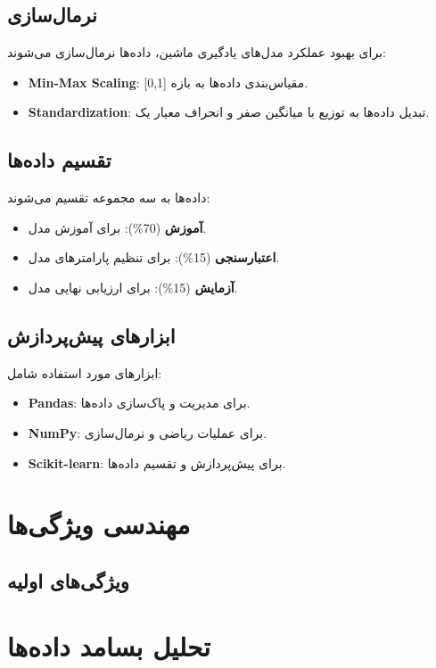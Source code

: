 \subsection{نرمال‌سازی}
برای بهبود عملکرد مدل‌های یادگیری ماشین، داده‌ها نرمال‌سازی می‌شوند:
\begin{itemize}
	\item \textbf{Min-Max Scaling}: مقیاس‌بندی داده‌ها به بازه [0,1].
	\item \textbf{Standardization}: تبدیل داده‌ها به توزیع با میانگین صفر و انحراف معیار یک.
\end{itemize}

\subsection{تقسیم داده‌ها}
داده‌ها به سه مجموعه تقسیم می‌شوند:
\begin{itemize}
	\item \textbf{آموزش} (70\%): برای آموزش مدل.
	\item \textbf{اعتبارسنجی} (15\%): برای تنظیم پارامترهای مدل.
	\item \textbf{آزمایش} (15\%): برای ارزیابی نهایی مدل.
\end{itemize}

\subsection{ابزارهای پیش‌پردازش}
ابزارهای مورد استفاده شامل:
\begin{itemize}
	\item \textbf{Pandas}: برای مدیریت و پاک‌سازی داده‌ها.
	\item \textbf{NumPy}: برای عملیات ریاضی و نرمال‌سازی.
	\item \textbf{Scikit-learn}: برای پیش‌پردازش و تقسیم داده‌ها.
\end{itemize}

\section{مهندسی ویژگی‌ها}
\label{sec:feature_engineering}

\subsection{ویژگی‌های اولیه}


\section{تحلیل بسامد داده‌ها}
\label{sec:frequency_analysis}


